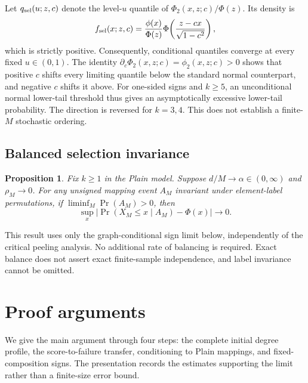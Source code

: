 \documentclass[11pt,a4paper]{article}
\newtheorem{proposition}[theorem]{Proposition}
\begin{document}
Let $q_{\rm sel}(u;z,c)$ denote the level-$u$ quantile of $\Phi_2(x,z;c)/\Phi(z)$. Its density is
\begin{equation}
f_{\rm sel}(x;z,c)=\frac{\phi(x)}{\Phi(z)}
\Phi\!\left(\frac{z-cx}{\sqrt{1-c^2}}\right),
\end{equation}
which is strictly positive. Consequently, conditional quantiles converge at every fixed $u\in(0,1)$. The identity
$\partial_c\Phi_2(x,z;c)=\phi_2(x,z;c)>0$
shows that positive $c$ shifts every limiting quantile below the standard normal counterpart, and negative $c$ shifts it above. For one-sided signs and $k\ge5$, an unconditional normal lower-tail threshold thus gives an asymptotically excessive lower-tail probability. The direction is reversed for $k=3,4$. This does not establish a finite-$M$ stochastic ordering.

\subsection{Balanced selection invariance}
\begin{proposition}\label{prop:balanced}
Fix $k\ge1$ in the Plain model. Suppose $d/M\to\alpha\in(0,\infty)$ and $\rho_M\to0$. For any unsigned mapping event $A_M$ invariant under element-label permutations, if $\liminf_M\Pr(A_M)>0$, then
\begin{equation}
\sup_x\left|\Pr(X_M\le x\mid A_M)-\Phi(x)\right|\longrightarrow0.
\end{equation}
\end{proposition}
This result uses only the graph-conditional sign limit below, independently of the critical peeling analysis. No additional rate of balancing is required. Exact balance does not assert exact finite-sample independence, and label invariance cannot be omitted.

\section{Proof arguments}
We give the main argument through four steps: the complete initial degree profile, the score-to-failure transfer, conditioning to Plain mappings, and fixed-composition signs. The presentation records the estimates supporting the limit rather than a finite-size error bound.
\end{document}
